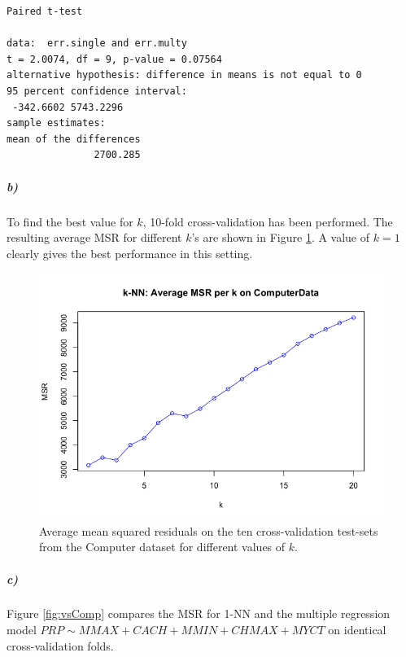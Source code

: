 \documentclass{paper}
\begin{document}
\begin{minipage}{\linewidth}
  \begin{lstlisting}[caption={Results of paired t-test single vs. multiple regression.},
    label=list:res1]
	Paired t-test

data:  err.single and err.multy
t = 2.0074, df = 9, p-value = 0.07564
alternative hypothesis: difference in means is not equal to 0
95 percent confidence interval:
 -342.6602 5743.2296
sample estimates:
mean of the differences 
               2700.285 
  \end{lstlisting}
\end{minipage}


\subparagraph{b)}

To find the best value for $k$, 10-fold cross-validation has been performed. The resulting average MSR for different $k$'s are shown in 
Figure \ref{fig:knnComp}. A value of $k=1$ clearly gives the best performance in this setting.

\begin{figure}[h]
\begin{center}
\includegraphics[width=0.8\linewidth]{knnComp}
\end{center}
\caption{Average mean squared residuals on the ten cross-validation test-sets from the Computer dataset  for different values of $k$. }
\label{fig:knnComp}
\end{figure}


\subparagraph{c)}

Figure \ref{fig:vsComp} compares the MSR for 1-NN and the multiple regression model $PRP\sim MMAX+CACH+MMIN+CHMAX+MYCT$
on identical cross-validation folds. 
\end{document}
